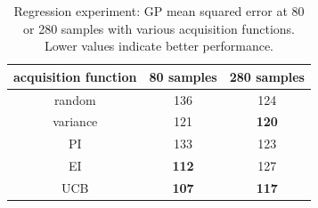 \documentclass{sig-alternate}
\begin{document}
\begin{table}[tb]
\caption{Regression experiment: GP mean squared error at 80 or 280 samples with various acquisition functions. Lower values indicate better performance.}
\centering
\begin{tabular}{|c|c|c|}
\hline
acquisition function & 80 samples   & 280 samples  \\ \hline
random                                                        & 136          & 124          \\ \hline
variance                                                      & 121          & \textbf{120} \\ \hline
PI                                                            & 133          & 123          \\ \hline
EI                                                            & \textbf{112} & 127          \\ \hline
UCB                                                           & \textbf{107} & \textbf{117} \\ \hline
\end{tabular}
\label{tab:reg_res}
\end{table}
\end{document}
